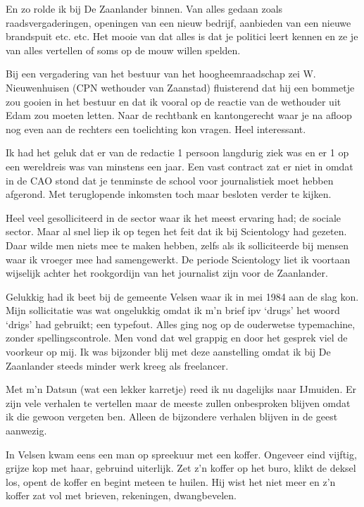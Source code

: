 \documentclass[10pt,twoside,openright]{memoir}
\begin{document}
En zo rolde ik bij De Zaanlander binnen. Van alles gedaan zoals raadsvergaderingen, openingen van een nieuw bedrijf, aanbieden van een nieuwe brandspuit etc. etc. Het mooie van dat alles is dat je politici leert kennen en ze je van alles vertellen of soms op de mouw willen spelden. 

Bij een vergadering van het bestuur van het hoogheemraadschap zei W. Nieuwenhuisen (CPN wethouder van Zaanstad) fluisterend dat hij een bommetje zou gooien in het bestuur en dat ik vooral op de reactie van de wethouder uit Edam zou moeten letten. Naar de rechtbank en kantongerecht waar je na afloop nog even aan de rechters een toelichting kon vragen. Heel interessant. 

Ik had het geluk dat er van de redactie 1 persoon langdurig ziek was en er 1 op een wereldreis was van minstens een jaar. Een vast contract zat er niet in omdat in de CAO stond dat je tenminste de school voor journalistiek moet hebben afgerond. Met teruglopende inkomsten toch maar besloten verder te kijken.

Heel veel gesolliciteerd in de sector waar ik het meest ervaring had; de sociale sector. Maar al snel liep ik op tegen het feit dat ik bij Scientology had gezeten. Daar wilde men niets mee te maken hebben, zelfs als ik solliciteerde bij mensen waar ik vroeger mee had samengewerkt. De periode Scientology liet ik voortaan wijselijk achter het rookgordijn van het journalist zijn voor de Zaanlander. 

Gelukkig had ik beet bij de gemeente Velsen waar ik in mei 1984 aan de slag kon. Mijn sollicitatie was wat ongelukkig omdat ik m’n brief ipv ‘drugs’ het woord ‘drigs’ had gebruikt; een typefout. Alles ging nog op de ouderwetse typemachine, zonder spellingscontrole. Men vond dat wel grappig en door het gesprek viel de voorkeur op mij. Ik was bijzonder blij met deze aanstelling omdat ik bij De Zaanlander steeds minder werk kreeg als freelancer.

Met m’n Datsun (wat een lekker karretje) reed ik nu dagelijks naar IJmuiden. Er zijn vele verhalen te vertellen maar de meeste zullen onbesproken blijven omdat ik die gewoon vergeten ben. Alleen de bijzondere verhalen blijven in de geest aanwezig.

In Velsen kwam eens een man op spreekuur met een koffer. Ongeveer eind vijftig, grijze kop met haar, gebruind uiterlijk. Zet z’n koffer op het buro, klikt de deksel los, opent de koffer en begint meteen te huilen. Hij wist het niet meer en z’n koffer zat vol met brieven, rekeningen, dwangbevelen. 
\end{document}
